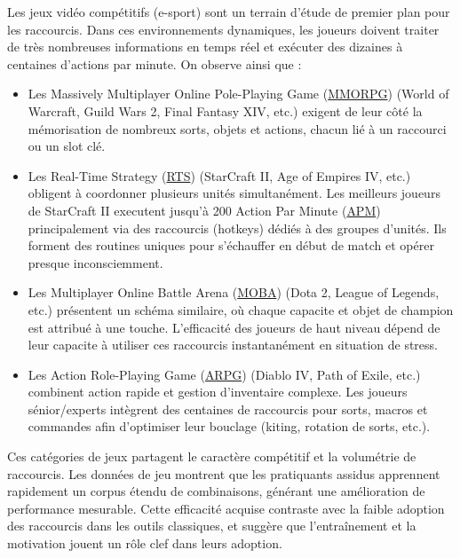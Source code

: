\documentclass[a4paper,12pt]{article}
\begin{document}
Les jeux vidéo compétitifs (e-sport) sont un terrain d'étude de premier plan pour les raccourcis. Dans ces environnements dynamiques, les joueurs doivent traiter de très nombreuses informations en temps réel et exécuter des dizaines à centaines d'actions par minute. On observe ainsi que :
\begin{itemize}
\item Les Massively Multiplayer Online Pole-Playing Game
 (\protect\hyperlink{gls-8}{\label{gls-8-use-1}MMORPG}) (World of Warcraft, Guild Wars 2, Final Fantasy XIV, etc.) exigent de leur côté la mémorisation de nombreux sorts, objets et actions, chacun lié à un raccourci ou un slot clé.
\item Les Real-Time Strategy
 (\protect\hyperlink{gls-9}{\label{gls-9-use-1}RTS}) (StarCraft II, Age of Empires IV, etc.) obligent à coordonner plusieurs unités simultanément. Les meilleurs joueurs de StarCraft II executent jusqu'à 200 Action Par Minute
 (\protect\hyperlink{gls-10}{\label{gls-10-use-1}APM}) principalement via des raccourcis (hotkeys) dédiés à des groupes d'unités\autocite{huangMasterMakerUnderstanding2017}. Ils forment des routines uniques pour s'échauffer en début de match et opérer presque inconsciemment.
\item Les Multiplayer Online Battle Arena
 (\protect\hyperlink{gls-11}{\label{gls-11-use-1}MOBA}) (Dota 2, League of Legends, etc.) présentent un schéma similaire, où chaque capacite et objet de champion est attribué à une touche. L'efficacité des joueurs de haut niveau dépend de leur capacite à utiliser ces raccourcis instantanément en situation de stress.
\item Les Action Role-Playing Game
 (\protect\hyperlink{gls-12}{\label{gls-12-use-1}ARPG}) (Diablo IV, Path of Exile, etc.) combinent action rapide et gestion d'inventaire complexe. Les joueurs sénior/experts intègrent des centaines de raccourcis pour sorts, macros et commandes afin d'optimiser leur bouclage (kiting, rotation de sorts, etc.).
\end{itemize}

Ces catégories de jeux partagent le caractère compétitif et la volumétrie de raccourcis. Les données de jeu montrent que les pratiquants assidus apprennent rapidement un corpus étendu de combinaisons, générant une amélioration de performance mesurable\autocite{huangMasterMakerUnderstanding2017}. Cette efficacité acquise contraste avec la faible adoption des raccourcis dans les outils classiques, et suggère que l'entraînement et la motivation jouent un rôle clef dans leurs adoption.
\end{document}
